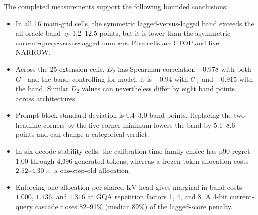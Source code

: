 The completed measurements support the following bounded conclusions:
\begin{itemize}
 \item In all 16 main-grid cells, the symmetric lagged-versus-lagged band exceeds the
 all-oracle band by 1.2--12.5 points, but it is lower than the asymmetric
 current-query-versus-lagged numbers.  Five cells are STOP and five NARROW.
 \item Across the 25 extension cells, $D_2$ has Spearman correlation $-0.978$ with both
 $G_+$ and the band; controlling for model, it is $-0.94$ with $G_+$ and
 $-0.915$ with the band.  Similar $D_2$
 values can nevertheless differ by eight band points across architectures.
 \item Prompt-block standard deviation is 0.4--3.0 band points.  Replacing the
 two headline corners by the five-corner minimum lowers the band by 5.1--8.6
 points and can change a categorical verdict.
 \item In six decode-stability cells, the calibration-time family choice has p90 regret 1.00
 through 4,096 generated tokens, whereas a frozen token allocation costs
 $2.52$--$4.30\times$ a one-step-old allocation.
 \item Enforcing one allocation per shared KV head gives marginal in-band costs
 $1.000$, $1.136$, and $1.316$ at GQA repetition factors 1, 4, and 8.  A 4-bit
 current-query cascade closes 82--91\% (median 89\%) of the lagged-score penalty.
\end{itemize}

\begin{table}[h]
\centering
\small
\caption{Predictor comparison on the 25 regime-map cells (\S\ref{sec:regimes}).  Columns: pooled Spearman correlation with $\gplus$; the same partialled on model identity; leave-one-model-out error of a log-linear fit of $\gplus$, as a multiplicative factor; mean Spearman within the held-out model.  All predictors are cell medians of per-head medians on the rows that define $D_2$; the recomputed $D_2$ matches the reported one to within 0.52 points in every cell.  The heterogeneity statistic is the spread of $\tfrac12\log_2 w_i$; for log-normal $w$ it ranks cells as the AM/GM ratio does.}
\label{tab:app-predictors}

\end{table}

